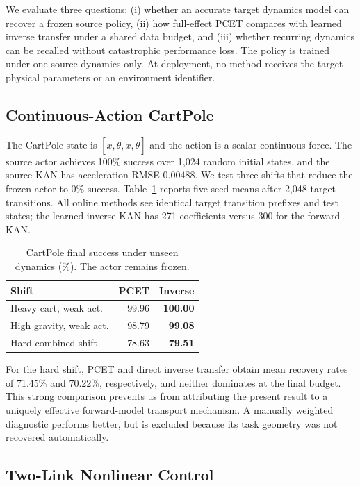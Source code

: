 \documentclass[letterpaper]{article}
\begin{document}
We evaluate three questions: (i) whether an accurate target dynamics model can
recover a frozen source policy, (ii) how full-effect PCET compares with learned
inverse transfer under a shared data budget, and (iii) whether recurring dynamics can be recalled without catastrophic
performance loss.  The policy is trained under one source
dynamics only.  At deployment, no method receives the target physical
parameters or an environment identifier.

\subsection{Continuous-Action CartPole}

The CartPole state is $[x,\theta,\dot x,\dot\theta]$ and the action is a scalar
continuous force.  The source actor achieves 100\% success over 1,024 random
initial states, and the source KAN has acceleration RMSE $0.00488$.  We test
three shifts that reduce the frozen actor to 0\% success.  Table~\ref{tab:cartpole}
reports five-seed means after 2,048 target transitions.  All online methods see
identical target transition prefixes and test states; the learned inverse KAN
has 271 coefficients versus 300 for the forward KAN.

\begin{table}[t]
\centering
\small
\caption{CartPole final success under unseen dynamics (\%).  The actor remains frozen.}
\label{tab:cartpole}
\begin{tabular}{@{}lrr@{}}
\toprule
Shift & PCET & Inverse \\
\midrule
Heavy cart, weak act. & 99.96 & \textbf{100.00} \\
High gravity, weak act. & 98.79 & \textbf{99.08} \\
Hard combined shift & 78.63 & \textbf{79.51} \\
\bottomrule
\end{tabular}
\end{table}

For the hard shift, PCET and direct inverse transfer obtain mean recovery rates
of 71.45\% and 70.22\%, respectively, and neither dominates at the final
budget.  This strong comparison prevents us from attributing the present result
to a uniquely effective forward-model transport mechanism.  A manually
weighted diagnostic performs better, but is excluded because its task geometry
was not recovered automatically.

\subsection{Two-Link Nonlinear Control}
\end{document}

